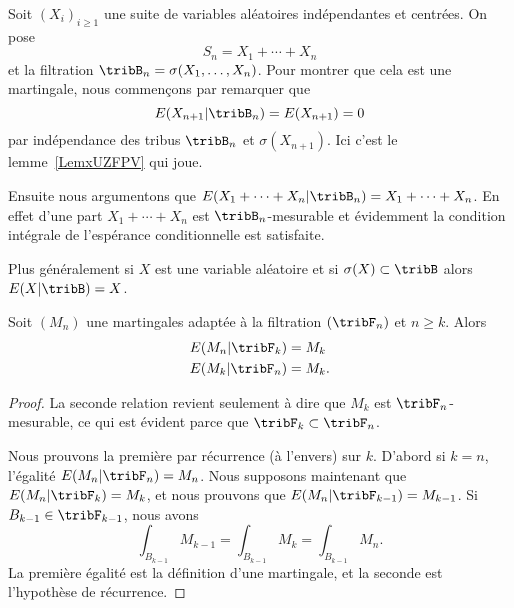 \begin{example}     \label{ExtFFKTr}
	Soit \( (X_i)_{i\geq 1}\) une suite de variables aléatoires indépendantes et centrées. On pose
	\begin{equation}
		S_n=X_1+\cdots +X_n
	\end{equation}
	et la filtration \( \tribB_n=\sigma(X_1,\ldots, X_n)\). Pour montrer que cela est une martingale, nous commençons par remarquer que
	\begin{equation}
		E(X_{n+1}|\tribB_n)=E(X_{n+1})=0
	\end{equation}
	par indépendance des tribus \( \tribB_n\) et \( \sigma(X_{n+1})\). Ici c'est le lemme~\ref{LemxUZFPV} qui joue.

	Ensuite nous argumentons que \( E(X_1+\cdots +X_n|\tribB_n)=X_1+\cdots +X_n\). En effet d'une part \( X_1+\cdots +X_n\) est \( \tribB_n\)-mesurable et évidemment la condition intégrale de l'espérance conditionnelle est satisfaite.

	Plus généralement si \( X\) est une variable aléatoire et si \( \sigma(X)\subset\tribB\) alors \( E(X|\tribB)=X\).
\end{example}

\begin{lemma}   \label{LemqanhgJ}
	Soit \( (M_n)\) une martingales adaptée à la filtration \( (\tribF_n)\) et \( n\geq k\). Alors
	\begin{subequations}
		\begin{align}
			E(M_n|\tribF_k) & =M_k  \\
			E(M_k|\tribF_n) & =M_k.
		\end{align}
	\end{subequations}
\end{lemma}

\begin{proof}
	La seconde relation revient seulement à dire que \( M_k\) est \( \tribF_n\)-mesurable, ce qui est évident parce que \( \tribF_k\subset\tribF_n\).

	Nous prouvons la première par récurrence (à l'envers) sur \( k\). D'abord si \( k=n\), l'égalité \( E(M_n|\tribF_n)=M_n\). Nous supposons maintenant que \( E(M_n|\tribF_k)=M_k\), et nous prouvons que \( E(M_n|\tribF_{k-1})=M_{k-1}\). Si \( B_{k-1}\in \tribF_{k-1}\), nous avons
	\begin{equation}
		\int_{B_{k-1}}M_{k-1}=\int_{B_{k-1}}M_{k}=\int_{B_{k-1}}M_n.
	\end{equation}
	La première égalité est la définition d'une martingale, et la seconde est l'hypothèse de récurrence.
\end{proof}

